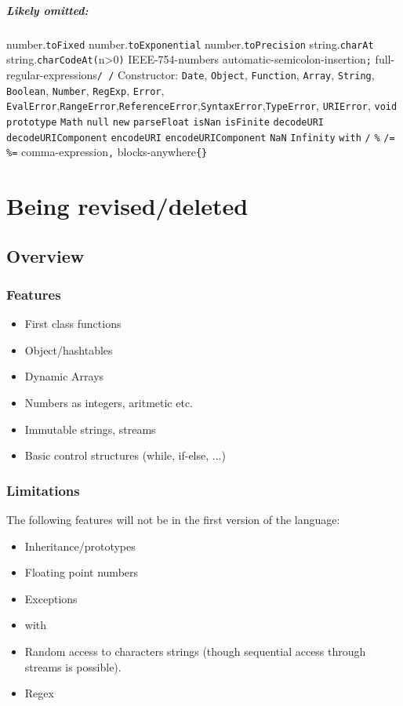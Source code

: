 \paragraph{Likely omitted:}
number.\verb|toFixed|
number.\verb|toExponential|
number.\verb|toPrecision|
string.\verb|charAt|
string.\verb|charCodeAt(|n>0\verb|)|
IEEE-754-numbers
automatic-semicolon-insertion\verb|;|
full-regular-expressions\verb|/ /|
Constructor: \verb|Date|, \verb|Object|, \verb|Function|, \verb|Array|, \verb|String|, \verb|Boolean|, \verb|Number|, \verb|RegExp|, \verb|Error|, \verb|EvalError|,\verb|RangeError|,\verb|ReferenceError|,\verb|SyntaxError|,\verb|TypeError|, \verb|URIError|,
\verb|void|
\verb|prototype|
\verb|Math|
\verb|null|
\verb|new|
\verb|parseFloat|
\verb|isNan|
\verb|isFinite|
\verb|decodeURI|
\verb|decodeURIComponent|
\verb|encodeURI|
\verb|encodeURIComponent|
\verb|NaN| \verb|Infinity|
\verb|with|
\verb|/|
\verb|%|
\verb|/=|
\verb|%=|
comma-expression\verb|,|
blocks-anywhere\verb|{}|



\chapter{Being revised/deleted}

\section{Overview}
\subsection{Features}

\begin{itemize}
\item First class functions
\item Object/hashtables
\item Dynamic Arrays
\item Numbers as integers, aritmetic etc.
\item Immutable strings, streams
\item Basic control structures (while, if-else, ...)
\end{itemize}

\subsection{Limitations}
The following features will not be in the first version of the language:
\begin{itemize}
\item Inheritance/prototypes
\item Floating point numbers
\item Exceptions
\item with
\item Random access to characters strings (though sequential access through streams is possible).
\item Regex
\end{itemize}

